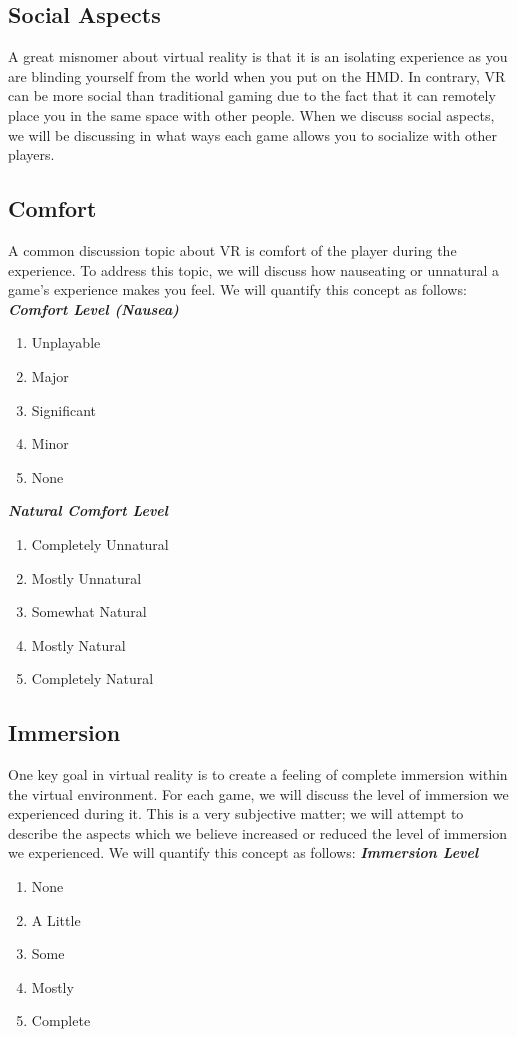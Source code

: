 \documentclass[journal]{IEEEtran}
\begin{document}
\subsection{Social Aspects}
A great misnomer about virtual reality is that it is an isolating experience as you are blinding yourself from the world when you put on the HMD. In contrary, VR can be more social than traditional gaming due to the fact that it can remotely place you in the same space with other people. When we discuss social aspects, we will be discussing in what ways each game allows you to socialize with other players.


\subsection{Comfort}
A common discussion topic about VR is comfort of the player during the experience. To address this topic, we will discuss how nauseating or unnatural a game's experience makes you feel. We will quantify this concept as follows: \newline\newline
\textit{\textbf{Comfort Level (Nausea)}}
\begin{enumerate}
	\item Unplayable
	\item Major
	\item Significant
	\item Minor
	\item None
\end{enumerate}

\noindent \textit{\textbf{Natural Comfort Level}}
\begin{enumerate}
	\item Completely Unnatural
	\item Mostly Unnatural
	\item Somewhat Natural 
	\item Mostly Natural
	\item Completely Natural
\end{enumerate}

\subsection{Immersion}
One key goal in virtual reality is to create a feeling of complete immersion within the virtual environment. For each game, we will discuss the level of immersion we experienced during it.  This is a very subjective matter; we will attempt to describe the aspects which we believe increased or reduced the level of immersion we experienced. 
We will quantify this concept as follows: \newline\newline
\textit{\textbf{Immersion Level}}
\begin{enumerate}
	\item None
	\item A Little
	\item Some
	\item Mostly
	\item Complete
\end{enumerate}
\end{document}
